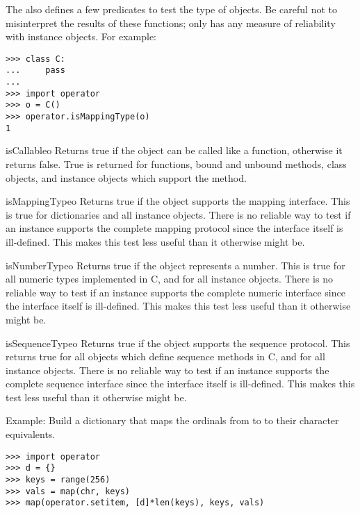 The  also defines a few predicates to test the type
of objects.    Be careful not to misinterpret the
results of these functions; only  has any
measure of reliability with instance objects.  For example:

\begin{verbatim}
>>> class C:
...     pass
... 
>>> import operator
>>> o = C()
>>> operator.isMappingType(o)
1
\end{verbatim}

\begin{funcdesc}{isCallable}{o}
Returns true if the object  can be called like a function,
otherwise it returns false.  True is returned for functions, bound and
unbound methods, class objects, and instance objects which support the
 method.
\end{funcdesc}

\begin{funcdesc}{isMappingType}{o}
Returns true if the object  supports the mapping interface.
This is true for dictionaries and all instance objects.
 There is no reliable way to test if an instance
supports the complete mapping protocol since the interface itself is
ill-defined.  This makes this test less useful than it otherwise might
be.
\end{funcdesc}

\begin{funcdesc}{isNumberType}{o}
Returns true if the object  represents a number.  This is true
for all numeric types implemented in C, and for all instance objects.
  There is no reliable way to test if an instance
supports the complete numeric interface since the interface itself is
ill-defined.  This makes this test less useful than it otherwise might
be.
\end{funcdesc}

\begin{funcdesc}{isSequenceType}{o}
Returns true if the object  supports the sequence protocol.
This returns true for all objects which define sequence methods in C,
and for all instance objects.   There is no reliable
way to test if an instance supports the complete sequence interface
since the interface itself is ill-defined.  This makes this test less
useful than it otherwise might be.
\end{funcdesc}


Example: Build a dictionary that maps the ordinals from  to
 to their character equivalents.

\begin{verbatim}
>>> import operator
>>> d = {}
>>> keys = range(256)
>>> vals = map(chr, keys)
>>> map(operator.setitem, [d]*len(keys), keys, vals)
\end{verbatim}
